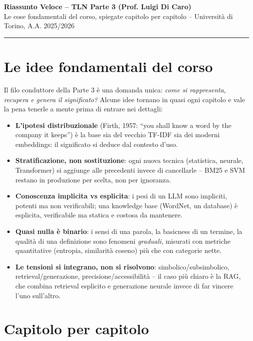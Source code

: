 \documentclass[11pt,a4paper]{article}
\begin{document}
\begin{center}
{\Large\textbf{Riassunto Veloce -- TLN Parte 3 (Prof. Luigi Di Caro)}}\\[2pt]
{\small Le cose fondamentali del corso, spiegate capitolo per capitolo -- Universit\`a di Torino, A.A. 2025/2026}
\end{center}
\vspace{2pt}
\hrule
\vspace{4pt}

\section*{Le idee fondamentali del corso}

Il filo conduttore della Parte 3 \`e una domanda unica: \emph{come si rappresenta, recupera e genera il significato?} Alcune idee tornano in quasi ogni capitolo e vale la pena tenerle a mente prima di entrare nei dettagli:

\begin{itemize}
\item \textbf{L'ipotesi distribuzionale} (Firth, 1957: ``you shall know a word by the company it keeps'') \`e la base sia del vecchio TF-IDF sia dei moderni embeddings: il significato si deduce dal contesto d'uso.
\item \textbf{Stratificazione, non sostituzione}: ogni nuova tecnica (statistica, neurale, Transformer) si aggiunge alle precedenti invece di cancellarle -- BM25 e SVM restano in produzione per scelta, non per ignoranza.
\item \textbf{Conoscenza implicita vs esplicita}: i pesi di un LLM sono impliciti, potenti ma non verificabili; una knowledge base (WordNet, un database) \`e esplicita, verificabile ma statica e costosa da mantenere.
\item \textbf{Quasi nulla \`e binario}: i sensi di una parola, la basicness di un termine, la qualit\`a di una definizione sono fenomeni \emph{graduali}, misurati con metriche quantitative (entropia, similarit\`a coseno) pi\`u che con categorie nette.
\item \textbf{Le tensioni si integrano, non si risolvono}: simbolico/subsimbolico, retrieval/generazione, precisione/accessibilit\`a -- il caso pi\`u chiaro \`e la RAG, che combina retrieval esplicito e generazione neurale invece di far vincere l'uno sull'altro.
\end{itemize}

\section*{Capitolo per capitolo}
\end{document}
